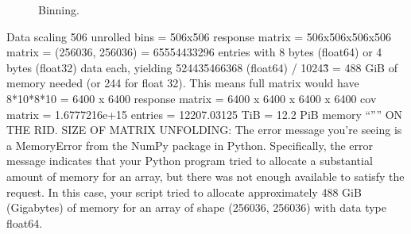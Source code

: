         \begin{figure}[H]
        \centering
        \hfill
        
        \caption[Binning]{Binning. }\label{fig:mig_ex}
    \end{figure}
    
    \iffalse
    Data scaling
    506 unrolled bins = 506x506 response matrix = 506x506x506x506 matrix = (256036, 256036) = 65554433296 entries with 8 bytes (float64) or 4 bytes (float32) data each, yielding 524435466368 (float64) / 1024\^3 = 488 GiB of memory needed (or 244 for float 32). 
    This means full matrix would have 8*10*8*10 = 6400 x 6400 response matrix =  6400 x 6400 x  6400 x 6400 cov matrix = 1.6777216e+15 entries = 12207.03125 TiB = 12.2 PiB memory
    “”” ON THE RID. SIZE OF MATRIX UNFOLDING:
    The error message you're seeing is a MemoryError from the NumPy package in Python. Specifically, the error message indicates that your Python program tried to allocate a substantial amount of memory for an array, but there was not enough available to satisfy the request. In this case, your script tried to allocate approximately 488 GiB (Gigabytes) of memory for an array of shape (256036, 256036) with data type float64.
    
